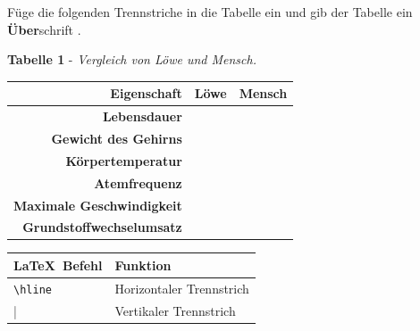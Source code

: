 \begin{frame}[fragile]
	\begin{Aufgabe}
		Füge die folgenden Trennstriche in die Tabelle ein und gib der Tabelle ein \textbf{Über}schrift \textrm{}.
	\end{Aufgabe}
	\begin{outputbox}
		\vspace{-0.2cm}
		\begin{center}
			\textbf{Tabelle 1} - \textit{Vergleich von Löwe und Mensch.}\vspace{0.1cm}
			\begin{tabular}{r|cc}
				\hline
				\textbf{Eigenschaft}				&	\textbf{Löwe}				& \textbf{Mensch} 	\\ \hline
				\textbf{Lebensdauer} 				&								& 					\\ 
				\textbf{Gewicht des Gehirns}		&								& 					\\ 
				\textbf{Körpertemperatur}			&								& 					\\
				\textbf{Atemfrequenz}				&								& 					\\
				\textbf{Maximale Geschwindigkeit}	&								& 					\\ 
				\textbf{Grundstoffwechselumsatz}	&								& 					\\
				\hline
			\end{tabular}
		\end{center}
		\vspace{-0.2cm}
	\end{outputbox}
	
	\btVFill\Befehle
	\begin{center}
		\begin{tabular}{ll}
			\toprule
			\LaTeX\ Befehl								&	Funktion								\\ \midrule
			\lstinline|\hline|							&	Horizontaler Trennstrich				\\
			\lstinline|||								&	Vertikaler Trennstrich					\\
			\bottomrule
		\end{tabular}
	\end{center}
	\vspace{0.1cm}
\end{frame}
